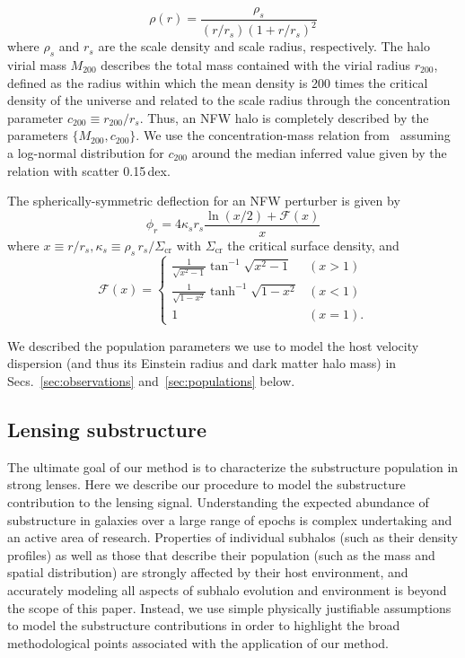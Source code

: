 \documentclass[twocolumn]{aastex62}
\begin{document}
\begin{equation}
\rho(r)=\frac{\rho_{s}}{\left(r / r_{s}\right)\left(1+r / r_{s}\right)^{2}}
\label{eq:rhoNFW}
\end{equation}
where $\rho_s$ and $r_s$ are the scale density and scale radius, respectively. The halo virial mass $M_{200}$ describes the total mass contained with the virial radius $r_{200}$, defined as the radius within which the mean density is 200 times the critical density of the universe and related to the scale radius through the concentration parameter $c_{200} \equiv r_{200}/r_s$. Thus, an NFW halo is completely described by the parameters $\{M_{200}, c_{200}\}$. We use the concentration-mass relation from~\citet{2014MNRAS.442.2271S} assuming a log-normal distribution for $c_{200}$ around the median inferred value given by the relation with scatter 0.15\,dex.

The spherically-symmetric deflection for an NFW perturber is given by~\citep{2001astro.ph..2341K}
\begin{equation}
\phi_{r}=4 \kappa_{s} r_{s} \frac{\ln (x / 2)+\mathcal{F}(x)}{x}
\end{equation}
where $x \equiv r/r_s, \kappa_s\equiv \rho_s\,r_s/\Sigma_\mathrm{cr}$ with $\Sigma_\mathrm{cr}$ the critical surface density, and
\begin{equation}
\mathcal{F}(x)=\left\{\begin{array}{ll}{\frac{1}{\sqrt{x^{2}-1}} \tan ^{-1} \sqrt{x^{2}-1}} & {(x>1)} \\ {\frac{1}{\sqrt{1-x^{2}}} \tanh ^{-1} \sqrt{1-x^{2}}} & {(x<1)} \\ {1} & {(x=1).}\end{array}\right.
\label{eq:Fx}
\end{equation}

We described the population parameters we use to model the host velocity dispersion (and thus its Einstein radius and dark matter halo mass) in Secs.~\ref{sec:observations} and~\ref{sec:populations} below.

\subsection{Lensing substructure}

The ultimate goal of our method is to characterize the substructure population in strong lenses. Here we describe our procedure to model the substructure contribution to the lensing signal. Understanding the expected abundance of substructure in galaxies over a large range of epochs is complex undertaking and an active area of research. Properties of individual subhalos (such as their density profiles) as well as those that describe their population (such as the mass and spatial distribution) are strongly affected by their host environment, and accurately modeling all aspects of subhalo evolution and environment is beyond the scope of this paper. Instead, we use simple physically justifiable assumptions to model the substructure contributions in order to highlight the broad methodological points associated with the application of our method.
\end{document}
